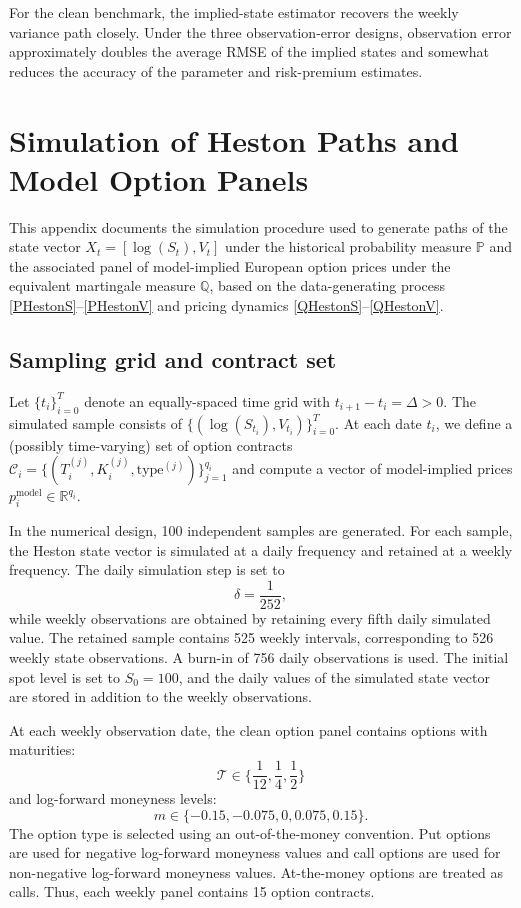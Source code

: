\documentclass[11pt,a4paper,notitlepage]{article}
\numberwithin{equation}{section}
\begin{document}
For the clean benchmark, the implied-state estimator recovers the weekly variance path closely. Under the three observation-error designs, observation error approximately doubles the average RMSE of the implied states and somewhat reduces the accuracy of the parameter and risk-premium estimates.

\newpage
\appendix
\section{Simulation of Heston Paths and Model Option Panels}
\label{app:sim_heston}

This appendix documents the simulation procedure used to generate paths of the state vector
$X_t=[\log(S_t),V_t]$ under the historical probability measure $\mathbb{P}$ and the associated
panel of model-implied European option prices under the equivalent martingale measure $\mathbb{Q}$,
based on the data-generating process \eqref{PHestonS}--\eqref{PHestonV} and pricing dynamics
\eqref{QHestonS}--\eqref{QHestonV}.

\subsection{Sampling grid and contract set}
Let $\{t_i\}_{i=0}^T$ denote an equally-spaced time grid with $t_{i+1}-t_i=\Delta>0$.
The simulated sample consists of $\{(\log(S_{t_i}),V_{t_i})\}_{i=0}^T$.
At each date $t_i$, we define a (possibly time-varying) set of option contracts
$\mathcal{C}_i=\{(T_i^{(j)},K_i^{(j)},\mathrm{type}^{(j)})\}_{j=1}^{q_i}$ and compute a vector of
model-implied prices $p_i^{\mathrm{model}}\in\mathbb{R}^{q_i}$.

In the numerical design, 100 independent samples are generated. For each sample, the Heston state vector is simulated at a daily frequency and retained at a weekly frequency. The daily simulation step is set to
\[
\delta=\frac{1}{252},
\]
while weekly observations are obtained by retaining every fifth daily simulated value. The retained sample contains 525 weekly intervals, corresponding to 526 weekly state observations. A burn-in of 756 daily observations is used. The initial spot level is set to $S_0=100$, and the daily values of the simulated state vector are stored in addition to the weekly observations.

At each weekly observation date, the clean option panel contains options with maturities:
\[
\mathcal T \in \lbrace \frac{1}{12},\frac{1}{4},\frac{1}{2}\rbrace
\]
and log-forward moneyness levels:
\[
m\in \lbrace-0.15,-0.075,0,0.075,0.15\rbrace.
\]
The option type is selected using an out-of-the-money convention. Put options are used for negative log-forward moneyness values and call options are used for non-negative log-forward moneyness values. At-the-money options are treated as calls. Thus, each weekly panel contains 15 option contracts.
\end{document}
